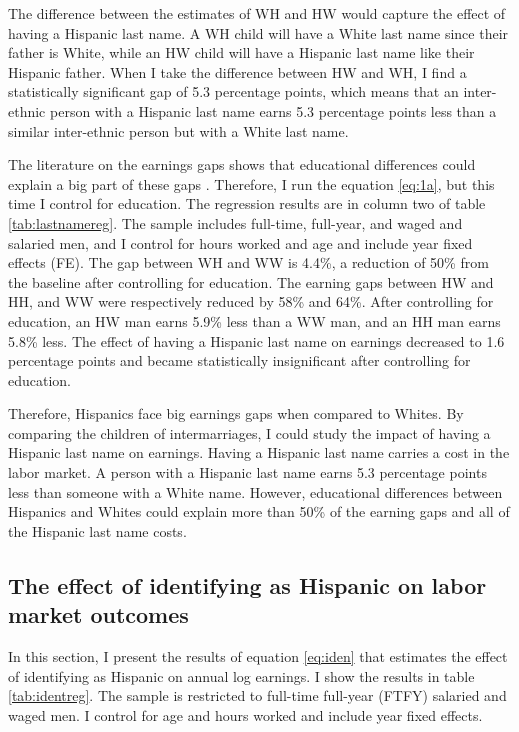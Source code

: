 \documentclass[12pt, fullpage]{article}
\begin{document}
The difference between the estimates of WH and HW would capture the effect of having a Hispanic last name. A WH child will have a White last name since their father is White, while an HW child will have a Hispanic last name like their Hispanic father. When I take the difference between HW and WH, I find a statistically significant gap of 5.3 percentage points, which means that an inter-ethnic person with a Hispanic last name earns 5.3 percentage points less than a similar inter-ethnic person but with a White last name.

The literature on the earnings gaps shows that educational differences could explain a big part of these gaps \citep{duncan2006hispanics, duncan2017complexity, duncan2018identifying, duncan2020new}. Therefore, I run the equation \ref{eq:1a}, but this time I control for education. The regression results are in column two of table \ref{tab:lastnamereg}. The sample includes full-time, full-year, and waged and salaried men, and I control for hours worked and age and include year fixed effects (FE). The gap between WH and WW is 4.4\%, a reduction of 50\% from the baseline after controlling for education. The earning gaps between HW and HH, and WW were respectively reduced by 58\% and 64\%. After controlling for education, an HW man earns 5.9\% less than a WW man, and an HH man earns 5.8\% less. The effect of having a Hispanic last name on earnings decreased to 1.6 percentage points and became statistically insignificant after controlling for education.




Therefore, Hispanics face big earnings gaps when compared to Whites. By comparing the children of intermarriages, I could study the impact of having a Hispanic last name on earnings. Having a Hispanic last name carries a cost in the labor market. A person with a Hispanic last name earns 5.3 percentage points less than someone with a White name. However, educational differences between Hispanics and Whites could explain more than 50\% of the earning gaps and all of the Hispanic last name costs.

\subsection{The effect of identifying as Hispanic on labor market outcomes}

In this section, I present the results of equation \ref{eq:iden} that estimates the effect of identifying as Hispanic on annual log earnings. I show the results in table \ref{tab:identreg}. The sample is restricted to full-time full-year (FTFY) salaried and waged men. I control for age and hours worked and include year fixed effects.
\end{document}
